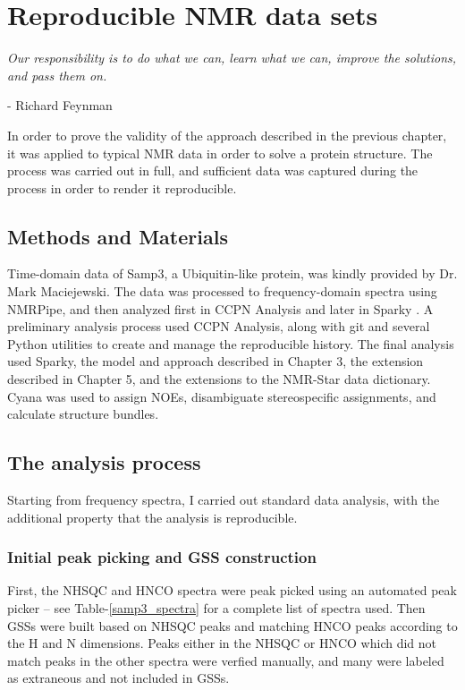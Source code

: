 \chapter{Reproducible NMR data sets}

\begin{center}
  \textit{Our responsibility is to do what we can, learn what we can, 
    improve the solutions, and pass them on.}

 - Richard Feynman
\end{center}


In order to prove the validity of the approach described in the previous
chapter, it was applied to typical NMR data in order to solve a protein
structure.  The process was carried out in full, and sufficient data was
captured during the process in order to render it reproducible.


\section{Methods and Materials}

Time-domain data of Samp3, a Ubiquitin-like protein, was kindly provided by 
Dr. Mark Maciejewski.  The data was processed to frequency-domain spectra
using NMRPipe, and then analyzed first in CCPN Analysis \cite{ccpn} and later 
in Sparky \cite{sparky}.  A preliminary analysis process used CCPN Analysis,
along with git and several Python utilities to create and manage the 
reproducible history.  The final analysis used Sparky, the model and approach
described in Chapter 3, the extension described in Chapter 5, and the 
extensions to the NMR-Star data dictionary.  Cyana was used to assign NOEs,
disambiguate stereospecific assignments, and calculate structure bundles.


\section{The analysis process}
Starting from frequency spectra, I carried out standard data analysis,
with the additional property that the analysis is reproducible.

\subsection{Initial peak picking and GSS construction}
First, the NHSQC and HNCO spectra were peak picked using an automated 
peak picker -- see Table-\ref{samp3_spectra} for a complete list of spectra
used.  Then GSSs were built based on NHSQC peaks and matching HNCO peaks
according to the H and N dimensions.  Peaks either in the NHSQC or HNCO
which did not match peaks in the other spectra were verfied manually, and
many were labeled as extraneous and not included in GSSs.


